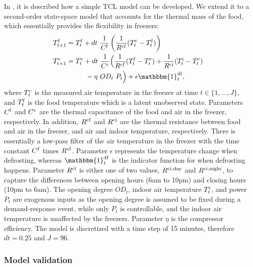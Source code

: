 In \cite{hao2014aggregate}, it is described how a simple TCL model can be developed. We extend it to a second-order state-space model that accounts for the thermal mass of the food, which essentially provides the flexibility in freezers:
%
\begin{subequations}\label{eq:2ndFreezerStateSpace}
    \begin{align}
        T^{\rm{f}}_{t+1} & = T^{\rm{f}}_{t} + dt\  \frac{1}{C^{\rm{f}}}\left(\frac{1}{R^{\rm{cf}}} (T^{\rm{c}}_{t} - T^{\rm{f}}_{t}) \right)                                                                                         \\
        T^{\rm{c}}_{t+1} & = T^{\rm{c}}_t + dt\  \frac{1}{C^{\rm{c}}}\Bigl(\frac{1}{R^{\rm{cf}}} (T^{\rm{f}}_t - T^{\rm{c}}_t) + \frac{1}{R^{\rm{ci}}} (T^{\rm{i}}_t - T^{\rm{c}}_t)                                          \notag \\ & \mspace{50mu} - \eta\  OD_t \ P_t \Bigr) + \epsilon \mathbbm{1}^{\rm{df}}_{t},
    \end{align}
\end{subequations}
%
where $T^{\rm{c}}_t$ is the measured air temperature in the freezer at time $t \in \{1, \ldots, J\}$, and $T^{\rm{f}}_t$ is the food temperature which is a latent unobserved state.
Parameters $C^{\rm{f}}$ and $C^{\rm{c}}$ are the thermal capacitance of the food and air in the freezer, respectively. In addition, $R^{\rm{cf}}$ and $R^{\rm{ci}}$ are the thermal resistance between food and air in the freezer, and air and indoor temperature, respectively.
There is essentially a low-pass filter of the air temperature in the freezer with the time constant $C^{\rm{f}}$ times $R^{\rm{cf}}$. Parameter $\epsilon$ represents the temperature change when defrosting, whereas $\mathbbm{1}^{\rm{df}}_{t}$ is the indicator function for when defrosting happens. Parameter $R^{\rm{ci}}$ is either one of two values, $R^{\rm{ci}, \text{day}}$ and $R^{\rm{ci}, \text{night}}$, to capture the differences between opening hours (6am to 10pm) and closing hours (10pm to 6am). The opening degree $OD_t$, indoor air temperature $T^{\rm{i}}_t$, and power $P_t$ are exogenous inputs as the opening degree is assumed to be fixed during a demand-response event, while only $P_t$ is controllable, and the indoor air temperature is unaffected by the freezers. Parameter $\eta$ is the compressor efficiency. The model is discretized with a time step of 15 minutes, therefore $dt = 0.25$ and $J = 96$.

\subsubsection{Model validation}

